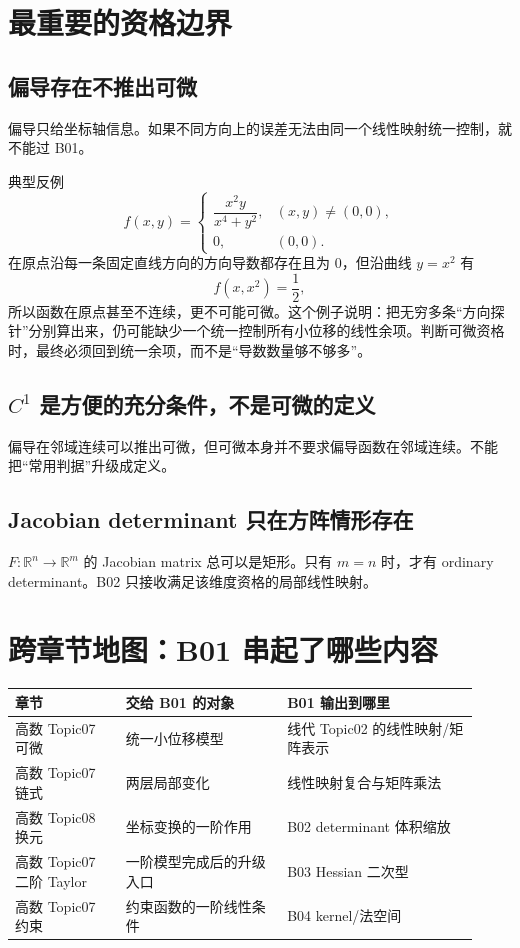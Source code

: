 \documentclass[profile=standard]{ipara-handbook}
\begin{document}
\section{最重要的资格边界}
\subsection{偏导存在不推出可微}
偏导只给坐标轴信息。如果不同方向上的误差无法由同一个线性映射统一控制，就不能过 B01。

典型反例
\[
f(x,y)=
\begin{cases}
\dfrac{x^2y}{x^4+y^2},&(x,y)\neq(0,0),\\
0,&(0,0).
\end{cases}
\]
在原点沿每一条固定直线方向的方向导数都存在且为 $0$，但沿曲线 $y=x^2$ 有
\[
f(x,x^2)=\frac12,
\]
所以函数在原点甚至不连续，更不可能可微。这个例子说明：把无穷多条“方向探针”分别算出来，仍可能缺少一个统一控制所有小位移的线性余项。判断可微资格时，最终必须回到统一余项，而不是“导数数量够不够多”。

\subsection{$C^1$ 是方便的充分条件，不是可微的定义}
偏导在邻域连续可以推出可微，但可微本身并不要求偏导函数在邻域连续。不能把“常用判据”升级成定义。

\subsection{Jacobian determinant 只在方阵情形存在}
$F:\mathbb R^n\to\mathbb R^m$ 的 Jacobian matrix 总可以是矩形。只有 $m=n$ 时，才有 ordinary determinant。B02 只接收满足该维度资格的局部线性映射。

\section{跨章节地图：B01 串起了哪些内容}
\begin{tabular}{p{0.22\linewidth}p{0.32\linewidth}p{0.38\linewidth}}
\hline
章节 & 交给 B01 的对象 & B01 输出到哪里\\
\hline
高数 Topic07 可微 & 统一小位移模型 & 线代 Topic02 的线性映射/矩阵表示\\
高数 Topic07 链式 & 两层局部变化 & 线性映射复合与矩阵乘法\\
高数 Topic08 换元 & 坐标变换的一阶作用 & B02 determinant 体积缩放\\
高数 Topic07 二阶 Taylor & 一阶模型完成后的升级入口 & B03 Hessian 二次型\\
高数 Topic07 约束 & 约束函数的一阶线性条件 & B04 kernel/法空间\\
\hline
\end{tabular}
\end{document}
